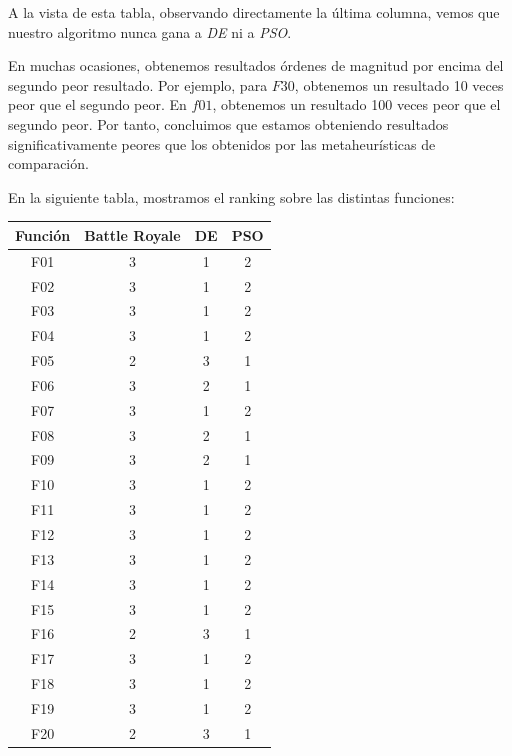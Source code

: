 \documentclass[11pt]{article}
\begin{document}
A la vista de esta tabla, observando directamente la última columna, vemos que nuestro algoritmo nunca gana a \emph{DE} ni a \emph{PSO}.

En muchas ocasiones, obtenemos resultados órdenes de magnitud por encima del segundo peor resultado. Por ejemplo, para $F30$, obtenemos un resultado 10 veces peor que el segundo peor. En $f01$, obtenemos un resultado 100 veces peor que el segundo peor. Por tanto, concluimos que estamos obteniendo resultados significativamente peores que los obtenidos por las metaheurísticas de comparación.

En la siguiente tabla, mostramos el ranking sobre las distintas funciones:

\begin{table}[H]
\centering
\begin{tabular}{|c|c|c|c|}
\hline
\textbf{Función} & \textbf{Battle Royale} &         \textbf{DE} &        \textbf{PSO} \\
\hline
F01  &             3 &      1 &      2 \\
F02  &             3 &      1 &      2 \\
F03  &             3 &      1 &      2 \\
F04  &             3 &      1 &      2 \\
F05  &             2 &      3 &      1 \\
F06  &             3 &      2 &      1 \\
F07  &             3 &      1 &      2 \\
F08  &             3 &      2 &      1 \\
F09  &             3 &      2 &      1 \\
F10  &             3 &      1 &      2 \\
F11  &             3 &      1 &      2 \\
F12  &             3 &      1 &      2 \\
F13  &             3 &      1 &      2 \\
F14  &             3 &      1 &      2 \\
F15  &             3 &      1 &      2 \\
F16  &             2 &      3 &      1 \\
F17  &             3 &      1 &      2 \\
F18  &             3 &      1 &      2 \\
F19  &             3 &      1 &      2 \\
F20  &             2 &      3 &      1 \\

\end{tabular}
\end{table}
\end{document}
